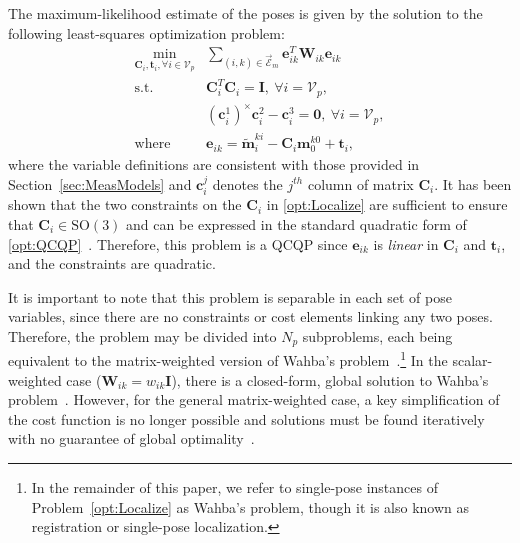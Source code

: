 \documentclass[lettersize,journal]{IEEEtran}
\newcommand{\EdgeSet}{\vec{\bm{\mathcal{E}}}}
\newcommand{\VertSetP}{\bm{\mathcal{V}}_p}
\begin{document}
The maximum-likelihood estimate of the poses is given by the solution to the following least-squares optimization problem:
\begin{equation}
	\label{opt:Localize}
	\begin{array}{rl}
		\min\limits_{\bm{C}_i,\bm{t}_i, \forall  i \in \VertSetP} &\sum\limits_{(i,k)\in\EdgeSet_m} \bm{e}_{ik}^T \bm{W}_{ik} \bm{e}_{ik} \\
		\mbox{s.t.} &  \bm{C}_i^T \bm{C}_i = \bm{I}, ~\forall i = \VertSetP,\\
		& (\bm{c}_i^{1})^\times\bm{c}_i^{2} - \bm{c}_i^{3} = \bm{0},~\forall i = \VertSetP, \\
		\mbox{where} & \bm{e}_{ik} = \tilde{\bm{m}}_i^{ki} - \bm{C}_i\bm{m}_0^{k0} + \bm{t}_i ,
	\end{array}
\end{equation}
where the variable definitions are consistent with those provided in Section~\ref{sec:MeasModels} and $\bm{c}_i^j$ denotes the $j^{th}$ column of matrix $\bm{C}_i$. It has been shown that the two constraints on the $\bm{C}_i$ in \eqref{opt:Localize} are sufficient to ensure that $\bm{C}_i\in\mbox{SO}(3)$ and can be expressed in the standard quadratic form of \eqref{opt:QCQP}~\cite{tronInclusionDeterminantConstraints}. Therefore, this problem is a QCQP since $\bm{e}_{ik}$ is \emph{linear} in $\bm{C}_i$ and $\bm{t}_i$, and the constraints are quadratic. 

It is important to note that this problem is separable in each set of pose variables, since there are no constraints or cost elements linking any two poses. Therefore, the problem may be divided into $N_p$ subproblems, each being equivalent to the matrix-weighted version of Wahba's problem~\cite{chengTotalLeastSquaresEstimate2019, wahbaLeastSquaresEstimate1965}.\footnote{In the remainder of this paper, we refer to single-pose instances of Problem~\ref{opt:Localize} as Wahba's problem, though it is also known as registration or single-pose localization.} In the scalar-weighted case ($ \bm{W}_{ik} = w_{ik} \bm{I} $), there is a closed-form, global solution to Wahba's problem~\cite{hornClosedFormSolutionAbsolute1988}. However, for the general matrix-weighted case, a key simplification of the cost function is no longer possible and solutions must be found iteratively with no guarantee of global optimality~\cite{barfootPoseEstimationUsing2011,barfootStateEstimationRobotics2017, crassidisSurveyNonlinearAttitude2007}. 
\end{document}
